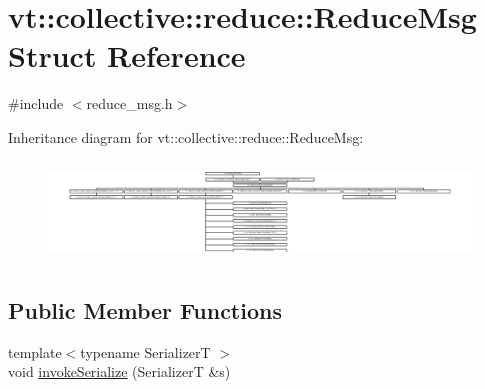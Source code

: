 \hypertarget{structvt_1_1collective_1_1reduce_1_1_reduce_msg}{}\section{vt\+:\+:collective\+:\+:reduce\+:\+:Reduce\+Msg Struct Reference}
\label{structvt_1_1collective_1_1reduce_1_1_reduce_msg}


{\ttfamily \#include $<$reduce\+\_\+msg.\+h$>$}

Inheritance diagram for vt\+:\+:collective\+:\+:reduce\+:\+:Reduce\+Msg\+:\begin{figure}[H]
\begin{center}
\leavevmode
\includegraphics[height=2.660333cm]{structvt_1_1collective_1_1reduce_1_1_reduce_msg}
\end{center}
\end{figure}
\subsection*{Public Member Functions}
\begin{DoxyCompactItemize}
\item 
{\footnotesize template$<$typename SerializerT $>$ }\\void \hyperlink{structvt_1_1collective_1_1reduce_1_1_reduce_msg_a6f5e84fca312804e6f9ae976947c63de}{invoke\+Serialize} (SerializerT \&s)
\end{DoxyCompactItemize}
